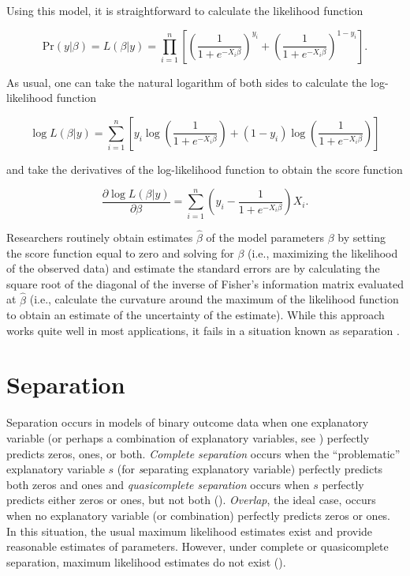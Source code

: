\documentclass[12pt]{article}
\begin{document}
Using this model, it is straightforward to calculate the likelihood function 

\begin{equation}\nonumber
\text{Pr}(y | \beta) = L(\beta | y) = \displaystyle \prod_{i = 1}^n \left[\left( \dfrac{1}{1 + e^{-X_i\beta}}\right)^{y_i} + \left( \dfrac{1}{1 + e^{-X_i\beta}}\right)^{1 - y_i}\right]\text{.}
\end{equation}

\noindent As usual, one can take the natural logarithm of both sides to calculate the log-likelihood function 

\begin{equation}\nonumber
\log L(\beta | y) = \displaystyle \sum_{i = 1}^n \left[y_i \log \left( \dfrac{1}{1 + e^{-X_i\beta}}\right) + (1 - y_i) \log \left( \dfrac{1}{1 + e^{-X_i\beta}}\right)\right]
\end{equation}

\noindent and take the derivatives of the log-likelihood function to obtain the score function

\begin{equation}\nonumber
\dfrac{\partial \log L(\beta | y)}{\partial \beta} = \displaystyle \sum_{i = 1}^n\left(y_i - \dfrac{1}{1 + e^{-X_i\beta}}\right)X_i\text{.}
\end{equation}

Researchers routinely obtain estimates $\hat{\beta}$ of the model parameters $\beta$ by setting the score function equal to zero and solving for $\beta$ (i.e., maximizing the likelihood of the observed data) and estimate the standard errors are by calculating the square root of the diagonal of the inverse of Fisher's information matrix evaluated at $\hat{\beta}$ (i.e., calculate the curvature around the maximum of the likelihood function to obtain an estimate of the uncertainty of the estimate). While this approach works quite well in most applications, it fails in a situation known as separation \citep{Zorn2005}.

\section*{Separation}

Separation occurs in models of binary outcome data when one explanatory variable (or perhaps a combination of explanatory variables, see \cite{LesaffreAlbert1989}) perfectly predicts zeros, ones, or both. \textit{Complete separation} occurs when the ``problematic'' explanatory variable $s$ (for \textit{s}eparating explanatory variable) perfectly predicts both zeros and ones and \textit{quasicomplete separation} occurs when $s$ perfectly predicts either zeros or ones, but not both (\citealt{AlbertAnderson1984, Zorn2005}). \textit{Overlap}, the ideal case, occurs when no explanatory variable (or combination) perfectly predicts zeros or ones. In this situation, the usual maximum likelihood estimates exist and provide reasonable estimates of parameters. However, under complete or quasicomplete separation, maximum likelihood estimates do not exist (\citealt{AlbertAnderson1984, Zorn2005}).
\end{document}
